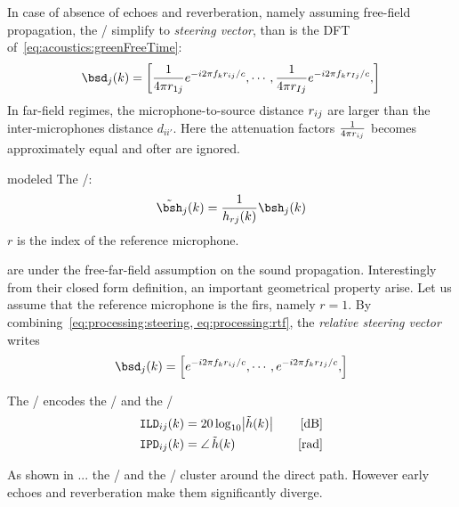 \label{eq:processing:steering}
In case of absence of echoes and reverberation, namely assuming free-field propagation,
the \RIRs/ simplify to \textit{steering vector}, than is the DFT of~\cref{eq:acoustics:greenFreeTime}:
\begin{equation}
    \bsd_{j}(k) = \klist{\frac{1}{4 \pi \distMicSrc_{1j}} \cste^{-\csti 2 \pi f_k \distMicSrc_{ij} / c},
                            \cdots,
                            \frac{1}{4 \pi \distMicSrc_{Ij}} \cste^{-\csti 2 \pi f_k \distMicSrc_{Ij} / c},
                    }
\end{equation}
In far-field regimes, the microphone-to-source distance $r_{ij}$ are larger than the
inter-microphones distance $d_{ii'}$. Here the attenuation factors $\frac{1}{4 \pi r_{ij}}$ becomes approximately equal
and ofter are ignored.


 modeled
The \RTFdef/:
\begin{equation}\label{eq:processing:rtf}
    \rtfs_j(k) = \frac{1}{\rir_{rj}(k)} \rirs_j(k)
\end{equation}
$r$ is the index of the reference microphone.

 are under the free-far-field assumption on the sound propagation.
Interestingly from their closed form definition, an important geometrical property arise.
Let us assume that the reference microphone is the firs, namely $r = 1$.
By combining~\cref{eq:processing:steering, eq:processing:rtf}, the \textit{relative steering vector} writes
\begin{equation}
    \bsd_{j}(k) = \klist{\cste^{-\csti 2 \pi f_k \distMicSrc_{ij} / c},
                         \cdots,
                         \cste^{-\csti 2 \pi f_k \distMicSrc_{Ij} / c},
                    }
\end{equation}

The \RTFs/ encodes the \ILDdef/ and the \IPDdef/
\begin{align}
    \ild_{ij}(k) &= 20 \log_{10} \magnitudeOf{\rtf(k)} \mathspace & [\si{\dB}]\\
    \ipd_{ij}(k) &= \phaseOf{\rtf(k)} \mathspace                  & [\si{\radian}]
\end{align}

As shown in ... the \ILD/ and the \IPD/ cluster around the direct path. However early echoes and
reverberation make them significantly diverge.


